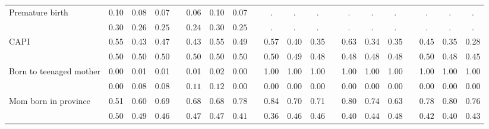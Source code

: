 \begin{center}
{\begin{longtable}{L{6cm} c c c p{.5cm} c c c p{.5cm} c c c p{.5cm} c c c p{.5cm} c c c}
 \quad Premature birth & 0.10 &      0.08 &      0.07 & &      0.06 &      0.10 &      0.07 & &         . &         . &         . & &         . &         . &         . & &         . &         . &         . \\*
 \quad & $\mathit{     0.30}$ & $\mathit{     0.26}$ & $\mathit{     0.25}$ & & $\mathit{     0.24}$ & $\mathit{     0.30}$ & $\mathit{     0.25}$ & & $\mathit{        .}$ & $\mathit{        .}$ & $\mathit{        .}$ & & $\mathit{        .}$ & $\mathit{        .}$ & $\mathit{        .}$ & & $\mathit{        .}$ & $\mathit{        .}$ & $\mathit{        .}$ \\[.2em]
 \quad CAPI & 0.55 &      0.43 &      0.47 & &      0.43 &      0.55 &      0.49 & &      0.57 &      0.40 &      0.35 & &      0.63 &      0.34 &      0.35 & &      0.45 &      0.35 &      0.28 \\*
 \quad & $\mathit{     0.50}$ & $\mathit{     0.50}$ & $\mathit{     0.50}$ & & $\mathit{     0.50}$ & $\mathit{     0.50}$ & $\mathit{     0.50}$ & & $\mathit{     0.50}$ & $\mathit{     0.49}$ & $\mathit{     0.48}$ & & $\mathit{     0.48}$ & $\mathit{     0.48}$ & $\mathit{     0.48}$ & & $\mathit{     0.50}$ & $\mathit{     0.48}$ & $\mathit{     0.45}$ \\[.2em]
 \quad Born to teenaged mother & 0.00 &      0.01 &      0.01 & &      0.01 &      0.02 &      0.00 & &      1.00 &      1.00 &      1.00 & &      1.00 &      1.00 &      1.00 & &      1.00 &      1.00 &      1.00 \\*
 \quad & $\mathit{     0.00}$ & $\mathit{     0.08}$ & $\mathit{     0.08}$ & & $\mathit{     0.11}$ & $\mathit{     0.12}$ & $\mathit{     0.00}$ & & $\mathit{     0.00}$ & $\mathit{     0.00}$ & $\mathit{     0.00}$ & & $\mathit{     0.00}$ & $\mathit{     0.00}$ & $\mathit{     0.00}$ & & $\mathit{     0.00}$ & $\mathit{     0.00}$ & $\mathit{     0.00}$ \\[.2em]
 \quad Mom born in province & 0.51 &      0.60 &      0.69 & &      0.68 &      0.68 &      0.78 & &      0.84 &      0.70 &      0.71 & &      0.80 &      0.74 &      0.63 & &      0.78 &      0.80 &      0.76 \\*
 \quad & $\mathit{     0.50}$ & $\mathit{     0.49}$ & $\mathit{     0.46}$ & & $\mathit{     0.47}$ & $\mathit{     0.47}$ & $\mathit{     0.41}$ & & $\mathit{     0.36}$ & $\mathit{     0.46}$ & $\mathit{     0.46}$ & & $\mathit{     0.40}$ & $\mathit{     0.44}$ & $\mathit{     0.48}$ & & $\mathit{     0.42}$ & $\mathit{     0.40}$ & $\mathit{     0.43}$ \\[.2em]

\end{longtable}}
\end{center}
